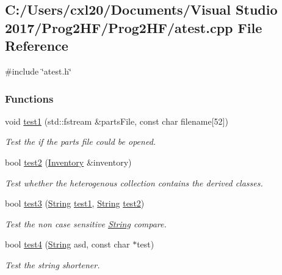 \subsection{C\+:/\+Users/cxl20/\+Documents/\+Visual Studio 2017/\+Prog2\+H\+F/\+Prog2\+H\+F/atest.cpp File Reference}
\label{atest_8cpp}
{\ttfamily \#include \char`\"{}atest.\+h\char`\"{}}\newline
\subsubsection*{Functions}
\begin{DoxyCompactItemize}
\item 
void \mbox{\hyperlink{atest_8cpp_acdf8ec90b79eca8d516b03baa19a1b44}{test1}} (std\+::fstream \&parts\+File, const char filename\mbox{[}52\mbox{]})
\begin{DoxyCompactList}\small\item\em Test the if the parts file could be opened. \end{DoxyCompactList}\item 
bool \mbox{\hyperlink{atest_8cpp_a4e5e4ea94633fee304b7f4490e655591}{test2}} (\mbox{\hyperlink{class_inventory}{Inventory}} \&inventory)
\begin{DoxyCompactList}\small\item\em Test whether the heterogenous collection contains the derived classes. \end{DoxyCompactList}\item 
bool \mbox{\hyperlink{atest_8cpp_a6e6df2af48d16780853d6eddcb8c8bc4}{test3}} (\mbox{\hyperlink{class_string}{String}} \mbox{\hyperlink{atest_8h_a377b49f7a65ef678441feafbbb111fd0}{test1}}, \mbox{\hyperlink{class_string}{String}} \mbox{\hyperlink{atest_8h_a4e5e4ea94633fee304b7f4490e655591}{test2}})
\begin{DoxyCompactList}\small\item\em Test the non case sensitive \mbox{\hyperlink{class_string}{String}} compare. \end{DoxyCompactList}\item 
bool \mbox{\hyperlink{atest_8cpp_ab545ece7a108a6470a3dc2161ba0008b}{test4}} (\mbox{\hyperlink{class_string}{String}} asd, const char $\ast$test)
\begin{DoxyCompactList}\small\item\em Test the string shortener. \end{DoxyCompactList}\end{DoxyCompactItemize}


